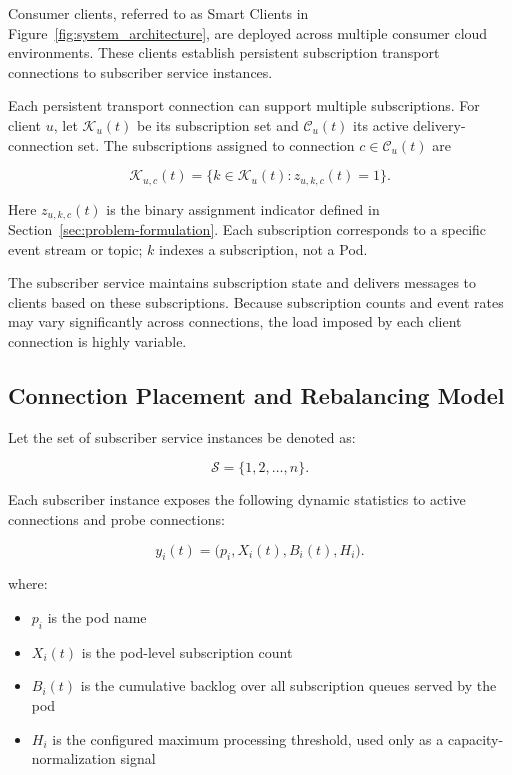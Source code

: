 \documentclass[manuscript,nonacm]{acmart}
\begin{document}
Consumer clients, referred to as Smart Clients in Figure~\ref{fig:system_architecture}, are deployed across multiple consumer cloud environments. These clients establish persistent subscription transport connections to subscriber service instances.

Each persistent transport connection can support multiple subscriptions. For
client $u$, let $\mathcal{K}_u(t)$ be its subscription set and
$\mathcal{C}_u(t)$ its active delivery-connection set. The subscriptions
assigned to connection $c\in\mathcal{C}_u(t)$ are

\begin{equation}
	\mathcal{K}_{u,c}(t)=\{k\in\mathcal{K}_u(t):z_{u,k,c}(t)=1\}.
\end{equation}

Here $z_{u,k,c}(t)$ is the binary assignment indicator defined in
Section~\ref{sec:problem-formulation}. Each subscription corresponds to a
specific event stream or topic; $k$ indexes a subscription, not a Pod.

The subscriber service maintains subscription state and delivers messages to clients based on these subscriptions.
Because subscription counts and event rates may vary significantly across connections, the load imposed by each client connection is highly variable.

\subsection{Connection Placement and Rebalancing Model}

Let the set of subscriber service instances be denoted as:

\begin{equation}
	\mathcal{S}=\{1,2,\ldots,n\}.
\end{equation}

Each subscriber instance exposes the following dynamic statistics to active
connections and probe connections:

\begin{equation}
	y_i(t)=\bigl(p_i,X_i(t),B_i(t),H_i\bigr).
\end{equation}

where:

\begin{itemize}
	\item $p_i$ is the pod name
	\item $X_i(t)$ is the pod-level subscription count
	\item $B_i(t)$ is the cumulative backlog over all subscription queues served by the pod
	\item $H_i$ is the configured maximum processing threshold, used only as a capacity-normalization signal
\end{itemize}
\end{document}
